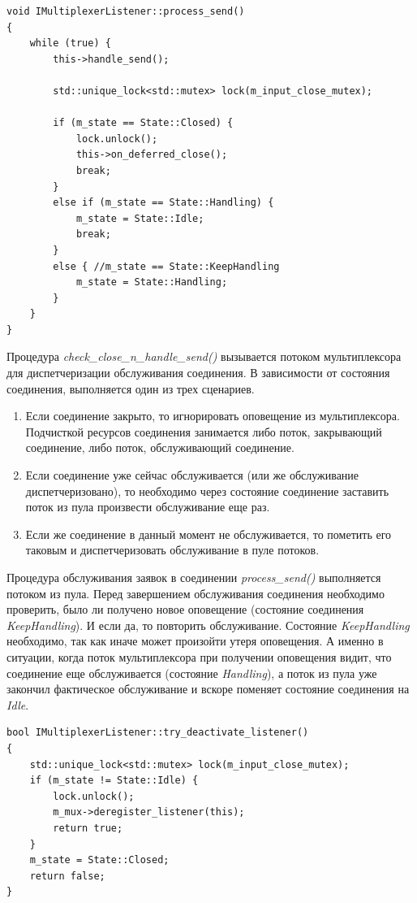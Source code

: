 \begin{lstlisting}[float=!h,caption={Процедура обслуживания соединения в мультиплексоре оповещений},label={chapter31:ServeHSHASession},frame=tlrb]
void IMultiplexerListener::process_send()
{
    while (true) {
        this->handle_send();	

        std::unique_lock<std::mutex> lock(m_input_close_mutex);
      
        if (m_state == State::Closed) {
            lock.unlock();
            this->on_deferred_close();
            break;
        }
        else if (m_state == State::Handling) {
            m_state = State::Idle;
            break;
        }
        else { //m_state == State::KeepHandling
            m_state = State::Handling;
        }
    }
}
\end{lstlisting}

Процедура \textit{check\_close\_n\_handle\_send()} вызывается потоком мультиплексора для диспетчеризации обслуживания соединения. В зависимости от состояния соединения, выполняется один из трех сценариев.
\begin{enumerate}
\item Если соединение закрыто, то игнорировать оповещение из мультиплексора. Подчисткой ресурсов соединения занимается либо поток, закрывающий соединение, либо поток, обслуживающий соединение.
\item Если соединение уже сейчас обслуживается (или же обслуживание диспетчеризовано), то необходимо через состояние соединение заставить поток из пула произвести обслуживание еще раз.
\item Если же соединение в данный момент не обслуживается, то пометить его таковым и диспетчеризовать обслуживание в пуле потоков.
\end{enumerate}

Процедура обслуживания заявок в соединении \textit{process\_send()} выполняется потоком из пула. Перед завершением обслуживания соединения необходимо проверить, было ли получено новое оповещение (состояние соединения \textit{KeepHandling}). И если да, то повторить обслуживание. Состояние \textit{KeepHandling} необходимо, так как иначе может произойти утеря оповещения. А именно в ситуации, когда поток мультиплексора при получении оповещения видит, что соединение еще обслуживается (состояние \textit{Handling}), а поток из пула уже закончил фактическое обслуживание и вскоре поменяет состояние соединения на \textit{Idle}.

\begin{lstlisting}[float=!h,caption={Процедура закрытия соединения в мультиплексоре оповещений},label={chapter31:CloseHSHASession},frame=tlrb]
bool IMultiplexerListener::try_deactivate_listener()
{
    std::unique_lock<std::mutex> lock(m_input_close_mutex);
    if (m_state != State::Idle) {
        lock.unlock();
        m_mux->deregister_listener(this);
        return true;
    }
    m_state = State::Closed;
    return false;
}
\end{lstlisting}

